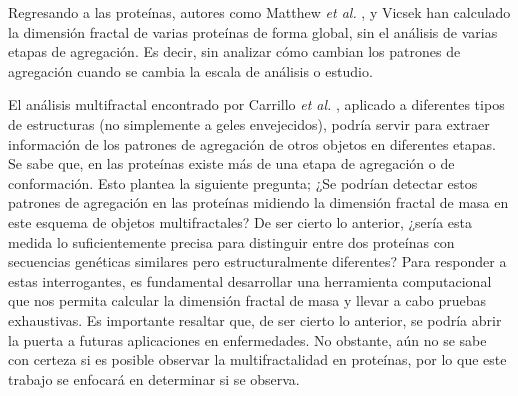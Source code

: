 Regresando a las prote\'{i}nas, autores como Matthew \textit{et al.} \cite{Enright2005}, y Vicsek han calculado la dimensi\'{o}n fractal de varias 
prote\'{i}nas de forma global, sin el an\'{a}lisis de varias etapas de agregaci\'{o}n. Es decir, sin analizar c\'{o}mo cambian los patrones 
de agregaci\'{o}n cuando se cambia la escala de an\'{a}lisis o estudio.

El an\'{a}lisis multifractal encontrado por Carrillo \textit{et al.} \cite{Carrillo2003}, aplicado a diferentes tipos de estructuras 
(no simplemente a geles envejecidos), podr\'{i}a servir para extraer informaci\'{o}n de los patrones de agregaci\'{o}n de otros objetos 
en diferentes etapas. Se sabe que, en las prote\'{i}nas existe m\'{a}s de una etapa de agregaci\'{o}n o de conformaci\'{o}n. Esto plantea 
la siguiente pregunta; ¿Se podr\'{i}an detectar estos patrones de agregaci\'{o}n en las prote\'{i}nas midiendo la dimensi\'{o}n fractal de 
masa en este esquema de objetos multifractales? De ser cierto lo anterior, ¿ser\'{i}a esta medida lo suficientemente precisa para distinguir 
entre dos prote\'{i}nas con secuencias gen\'{e}ticas similares pero estructuralmente diferentes? Para responder a estas interrogantes, es 
fundamental desarrollar una herramienta computacional que nos permita calcular la dimensi\'{o}n fractal de masa y llevar a cabo pruebas 
exhaustivas. Es importante resaltar que, de ser cierto lo anterior, se podr\'{i}a abrir la puerta a futuras aplicaciones en enfermedades. 
No obstante, a\'{u}n no se sabe con certeza si es posible observar la multifractalidad en prote\'{i}nas, por lo que este trabajo 
se enfocar\'{a} en determinar si se observa.









